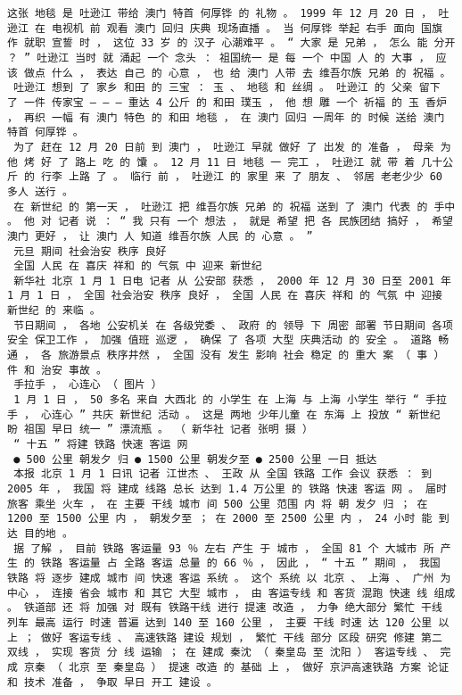 \documentclass{article}
\begin{document}
\begin{Verbatim}[commandchars=\\\{\}]
 这张 地毯 是 吐逊江 带给 澳门 特首 何厚铧 的 礼物 。 1999 年 12 月 20 日 ， 吐逊江 在 电视机 前 观看 澳门 回归 庆典 现场直播 。 当 何厚铧 举起 右手 面向 国旗 作 就职 宣誓 时 ， 这位 33 岁 的 汉子 心潮难平 。 “ 大家 是 兄弟 ， 怎么 能 分开 ？ ” 吐逊江 当时 就 涌起 一个 念头 ： 祖国统一 是 每 一个 中国 人 的 大事 ， 应该 做点 什么 ， 表达 自己 的 心意 ， 也 给 澳门 人带 去 维吾尔族 兄弟 的 祝福 。 
 吐逊江 想到 了 家乡 和田 的 三宝 ： 玉 、 地毯 和 丝绸 。 吐逊江 的 父亲 留下 了 一件 传家宝 — — — 重达 4 公斤 的 和田 璞玉 ， 他 想 雕 一个 祈福 的 玉 香炉 ， 再织 一幅 有 澳门 特色 的 和田 地毯 ， 在 澳门 回归 一周年 的 时候 送给 澳门 特首 何厚铧 。 
 为了 赶在 12 月 20 日前 到 澳门 ， 吐逊江 早就 做好 了 出发 的 准备 ， 母亲 为 他 烤 好 了 路上 吃 的 馕 。 12 月 11 日 地毯 一 完工 ， 吐逊江 就 带 着 几十公斤 的 行李 上路 了 。 临行 前 ， 吐逊江 的 家里 来 了 朋友 、 邻居 老老少少 60 多人 送行 。 
 在 新世纪 的 第一天 ， 吐逊江 把 维吾尔族 兄弟 的 祝福 送到 了 澳门 代表 的 手中 。 他 对 记者 说 ： “ 我 只有 一个 想法 ， 就是 希望 把 各 民族团结 搞好 ， 希望 澳门 更好 ， 让 澳门 人 知道 维吾尔族 人民 的 心意 。 ” 
 元旦 期间 社会治安 秩序 良好 
 全国 人民 在 喜庆 祥和 的 气氛 中 迎来 新世纪 
 新华社 北京 1 月 1 日电 记者 从 公安部 获悉 ， 2000 年 12 月 30 日至 2001 年 1 月 1 日 ， 全国 社会治安 秩序 良好 ， 全国 人民 在 喜庆 祥和 的 气氛 中 迎接 新世纪 的 来临 。 
 节日期间 ， 各地 公安机关 在 各级党委 、 政府 的 领导 下 周密 部署 节日期间 各项 安全 保卫工作 ， 加强 值班 巡逻 ， 确保 了 各项 大型 庆典活动 的 安全 。 道路 畅通 ， 各 旅游景点 秩序井然 ， 全国 没有 发生 影响 社会 稳定 的 重大 案 （ 事 ） 件 和 治安 事故 。 
 手拉手 ， 心连心 （ 图片 ） 
 1 月 1 日 ， 50 多名 来自 大西北 的 小学生 在 上海 与 上海 小学生 举行 “ 手拉手 ， 心连心 ” 共庆 新世纪 活动 。 这是 两地 少年儿童 在 东海 上 投放 “ 新世纪 盼 祖国 早日 统一 ” 漂流瓶 。 （ 新华社 记者 张明 摄 ） 
 “ 十五 ” 将建 铁路 快速 客运 网 
 ● 500 公里 朝发夕 归 ● 1500 公里 朝发夕至 ● 2500 公里 一日 抵达 
 本报 北京 1 月 1 日讯 记者 江世杰 、 王政 从 全国 铁路 工作 会议 获悉 ： 到 2005 年 ， 我国 将 建成 线路 总长 达到 1.4 万公里 的 铁路 快速 客运 网 。 届时 旅客 乘坐 火车 ， 在 主要 干线 城市 间 500 公里 范围 内 将 朝 发夕 归 ； 在 1200 至 1500 公里 内 ， 朝发夕至 ； 在 2000 至 2500 公里 内 ， 24 小时 能 到达 目的地 。 
 据 了解 ， 目前 铁路 客运量 93 ％ 左右 产生 于 城市 ， 全国 81 个 大城市 所 产生 的 铁路 客运量 占 全路 客运 总量 的 66 ％ ， 因此 ， “ 十五 ” 期间 ， 我国 铁路 将 逐步 建成 城市 间 快速 客运 系统 。 这个 系统 以 北京 、 上海 、 广州 为 中心 ， 连接 省会 城市 和 其它 大型 城市 ， 由 客运专线 和 客货 混跑 快速 线 组成 。 铁道部 还 将 加强 对 既有 铁路干线 进行 提速 改造 ， 力争 绝大部分 繁忙 干线 列车 最高 运行 时速 普遍 达到 140 至 160 公里 ， 主要 干线 时速 达 120 公里 以上 ； 做好 客运专线 、 高速铁路 建设 规划 ， 繁忙 干线 部分 区段 研究 修建 第二 双线 ， 实现 客货 分 线 运输 ； 在 建成 秦沈 （ 秦皇岛 至 沈阳 ） 客运专线 、 完成 京秦 （ 北京 至 秦皇岛 ） 提速 改造 的 基础 上 ， 做好 京沪高速铁路 方案 论证 和 技术 准备 ， 争取 早日 开工 建设 。 

\end{Verbatim}
\end{document}
